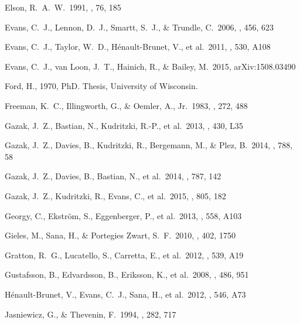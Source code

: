 \documentclass[useAMS,usenatbib]{mn2e}
\begin{document}
\begin{thebibliography}{99}
 Elson, R.~A.~W.\ 1991, \apjs,
76, 185

 Evans, C.~J., Lennon, D.~J., Smartt, S.~J., \& Trundle, C.\ 2006, \aap, 456, 623

 Evans, C.~J., Taylor, W.~D., H{\'e}nault-Brunet, V., et al.\ 2011, \aap, 530, A108

 Evans, C.~J., van Loon,
J.~T., Hainich, R., \& Bailey, M.\ 2015, arXiv:1508.03490

 Ford, H., 1970, PhD. Thesis, University of Wisconsin.

 Freeman, K.~C.,
Illingworth, G., \& Oemler, A., Jr.\ 1983, \apj, 272, 488

 Gazak, J.~Z., Bastian,
N., Kudritzki, R.-P., et al.\ 2013, \mnras, 430, L35

 Gazak, J.~Z., Davies, B.,
Kudritzki, R., Bergemann, M., \& Plez, B.\ 2014, \apj, 788, 58

 Gazak, J.~Z., Davies, B.,
Bastian, N., et al.\ 2014, \apj, 787, 142

 Gazak, J.~Z., Kudritzki,
R., Evans, C., et al.\ 2015, \apj, 805, 182

 Georgy, C., Ekstr{\"o}m, S., Eggenberger, P., et al.\ 2013, \aap, 558, A103

 Gieles, M., Sana, H.,
\& Portegies Zwart, S.~F.\ 2010, \mnras, 402, 1750

 Gratton, R.~G., Lucatello, S., Carretta, E., et al.\ 2012, \aap, 539, A19

 Gustafsson, B., Edvardsson, B., Eriksson, K., et al.\ 2008, \aap, 486, 951

 H{\'e}nault-Brunet, V., Evans, C.~J., Sana, H., et al.\ 2012, \aap, 546, A73

 Jasniewicz, G., \& Thevenin, F.\ 1994, \aap, 282, 717


\end{thebibliography}
\end{document}
